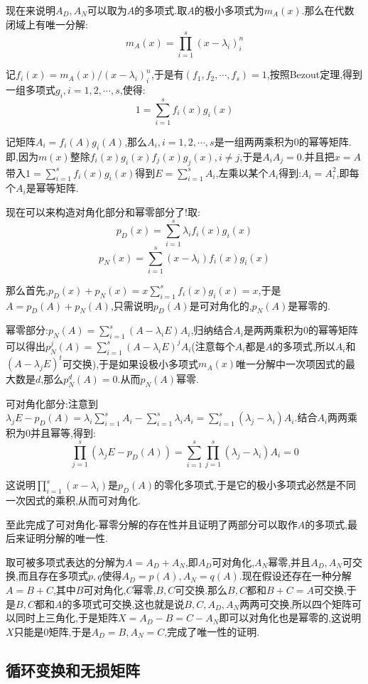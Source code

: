 现在来说明$A_D,A_N$可以取为$A$的多项式.取$A$的极小多项式为$m_A(x)$.那么在代数闭域上有唯一分解:
$$m_A(x)=\prod_{i=1}^{s}(x-\lambda_i)^n_i$$

记$f_i(x)=m_A(x)/(x-\lambda_i)^n_i$,于是有$(f_1,f_2,\cdots,f_s)=1$,按照Bezout定理,得到一组多项式$g_i,i=1,2,\cdots,s$,使得:
$$1=\sum_{i=1}^{s}f_i(x)g_i(x)$$

记矩阵$A_i=f_i(A)g_i(A)$,那么$A_i,i=1,2,\cdots,s$是一组两两乘积为0的幂等矩阵.即,因为$m(x)$整除$f_i(x)g_i(x)f_j(x)g_j(x),i\not=j$,于是$A_iA_j=0$.并且把$x=A$带入$1=\sum_{i=1}^{s}f_i(x)g_i(x)$得到$E=\sum_{i=1}^{s}A_i$,左乘以某个$A_i$得到:$A_i=A_i^2$,即每个$A_i$是幂等矩阵.

现在可以来构造对角化部分和幂零部分了!取:
$$p_D(x)=\sum_{i=1}^{s}\lambda_if_i(x)g_i(x)$$
$$p_N(x)=\sum_{i=1}^{s}(x-\lambda_i)f_i(x)g_i(x)$$

那么首先,$p_D(x)+p_N(x)=x\sum_{i=1}^{s}f_i(x)g_i(x)=x$,于是$A=p_D(A)+p_N(A)$,只需说明$p_D(A)$是可对角化的,$p_N(A)$是幂零的.

幂零部分:$p_N(A)=\sum_{i=1}^{s}(A-\lambda_i E)A_i$,归纳结合$A_i$是两两乘积为0的幂等矩阵可以得出$p_N^j(A)=\sum_{i=1}^{s}(A-\lambda_i E)^jA_i$(注意每个$A_i$都是$A$的多项式,所以$A_i$和$(A-\lambda_j E)^t$可交换),于是如果设极小多项式$m_A(x)$唯一分解中一次项因式的最大数是$d$,那么$p_N^d(A)=0$.从而$p_N(A)$幂零.

可对角化部分:注意到$\lambda_j E-p_D(A)=\lambda_i\sum_{i=1}^{s}A_i-\sum_{i=1}^{s}\lambda_iA_i
=\sum_{i=1}^{s}\left(\lambda_j-\lambda_i\right)A_i$.结合$A_i$两两乘积为0并且幂等,得到:
$$\prod_{j=1}^{s}(\lambda_j E-p_D(A))=
\sum_{i=1}^{s}\prod_{j=1}^{s}\left(\lambda_j-\lambda_i\right)A_i=0$$

这说明$\prod_{i=1}^{s}(x-\lambda_i)$是$p_D(A)$的零化多项式,于是它的极小多项式必然是不同一次因式的乘积,从而可对角化.

至此完成了可对角化-幂零分解的存在性并且证明了两部分可以取作$A$的多项式,最后来证明分解的唯一性.

取可被多项式表达的分解为$A=A_D+A_N$,即$A_D$可对角化,$A_N$幂零,并且$A_D,A_N$可交换,而且存在多项式$p,q$使得$A_D=p(A),A_N=q(A)$.现在假设还存在一种分解$A=B+C$,其中$B$可对角化,$C$幂零,$B,C$可交换.那么$B,C$都和$B+C=A$可交换,于是$B,C$都和$A$的多项式可交换,这也就是说$B,C,A_D,A_N$两两可交换,所以四个矩阵可以同时上三角化,于是矩阵$X=A_D-B=C-A_N$即可以对角化也是幂零的,这说明$X$只能是0矩阵,于是$A_D=B,A_N=C$,完成了唯一性的证明.
\newpage
\subsection{循环变换和无损矩阵}

